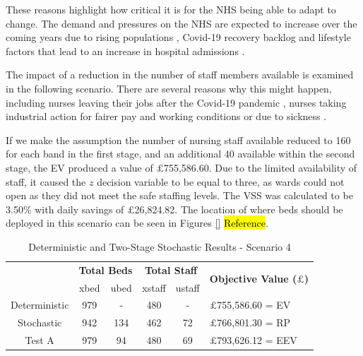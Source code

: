 \documentclass[../thesis.tex]{subfiles}
\begin{document}
These reasons highlight how critical it is for the NHS being able to adapt to change. The demand and pressures on the NHS are expected to increase over the coming years due to rising populations \cite{WelshGovernment2022b}, Covid-19 recovery backlog \cite{AGW2022} and lifestyle factors that lead to an increase in hospital admissions \cite{Luben2019}. 

The impact of a reduction in the number of staff members available is examined in the following scenario. There are several reasons why this might happen, including nurses leaving their jobs after the Covid-19 pandemic \cite{Devereux2022}, nurses taking industrial action for fairer pay and working conditions \cite{RCN2023} or due to sickness \cite{WelshGovernment2022a}.

If we make the assumption the number of nursing staff available reduced to 160 for each band in the first stage, and an additional 40 available within the second stage, the EV produced a value of $\pounds$755,586.60. Due to the limited availability of staff, it caused the $z$ decision variable to be equal to three, as wards could not open as they did not meet the safe staffing levels. %
The VSS was calculated to be 3.50\% with daily savings of $\pounds$26,824.82. The location of where beds should be deployed in this scenario can be seen in Figures \ref{} \hl{Reference}.

\begin{table}[h!]
    \centering
    \begin{tabular}{cccccl}\toprule
 & \multicolumn{2}{l}{\textbf{Total Beds}} & \multicolumn{2}{c}{\textbf{Total Staff}} & \multirow{2}{*}{\textbf{Objective Value ($\pounds$)}}\\ \cmidrule(lr){2-3} \cmidrule(lr){4-5}
         
 & xbed           & ubed          & xstaff         & ustaff         \\ \midrule
 Deterministic & 979 & - & 480 & - &$\pounds$755,586.60 = EV \\
 Stochastic & 942 & 134 & 462 & 72 & $\pounds$766,801.30 = RP \\
 Test A & 979 & 94 & 480 & 69 & $\pounds$793,626.12 = EEV \\\bottomrule
    \end{tabular}
    \caption{Deterministic and Two-Stage Stochastic Results - Scenario 4}
    \label{tab:Scenario4Results}
\end{table}
\end{document}
